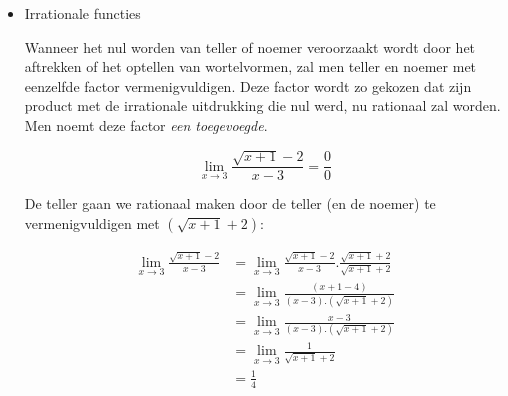 \begin{itemize}
\begin{voorbeeld}
Teller en noemer ontbinden in factoren:

teller: $x\text{\texttwosuperior}-9=(x-3)(x+3)$

noemer (via Horner): %
\begin{tabular}{cc|ccc}
	&  & $1$ & $1$ & $-12$\\
	& $3$ & $\downarrow$ & $3$ & $12$\\
	\cline{2-5} 
	&  & $1$ & \multicolumn{1}{c||}{$4$} & $0$\\
\end{tabular}

dus \begin{equation*}
x\text{\texttwosuperior}+x-12=(x-3)(x+4)
\end{equation*}

zodat \begin{equation}
{\displaystyle {\displaystyle \lim_{x\to3}}\frac{x\text{\texttwosuperior}-4}{x\text{\texttwosuperior}-7x+10}={\displaystyle \lim_{x\to3}}\frac{(x-3)(x+3)}{(x-3)(x+4)}={\displaystyle \lim_{x\to3}}\frac{(x+3)}{(x+4)}=\frac{3+3}{3+4}=\frac{6}{7}}
\end{equation}
\end{voorbeeld}


\item{Irrationale functies}

Wanneer het nul worden van teller of noemer veroorzaakt wordt door
het aftrekken of het optellen van wortelvormen, zal men teller en
noemer met eenzelfde factor vermenigvuldigen. Deze factor wordt zo
gekozen dat zijn product met de irrationale uitdrukking die nul werd,
nu rationaal zal worden. Men noemt deze factor \emph{een toegevoegde}.


\begin{voorbeeld}
	\begin{equation*}
{\displaystyle {\displaystyle \lim_{x\to3}}\frac{\sqrt{x+1}-2}{x-3}=\frac{0}{0}}
\end{equation*}

De teller gaan we rationaal maken door de teller (en de noemer) te
vermenigvuldigen met $\left(\sqrt{x+1}+2\right)$:

\begin{equation*}
\begin{array}{cl}
{\displaystyle {\displaystyle \lim_{x\to3}}\frac{\sqrt{x+1}-2}{x-3}} & {\displaystyle ={\displaystyle \lim_{x\to3}}\frac{\sqrt{x+1}-2}{x-3}.\frac{\sqrt{x+1}+2}{\sqrt{x+1}+2}}\\
& {\displaystyle ={\displaystyle \lim_{x\to3}}\frac{\left(x+1-4\right)}{\left(x-3\right).\left(\sqrt{x+1}+2\right)}}\\
& {\displaystyle ={\displaystyle \lim_{x\to3}}\frac{x-3}{\left(x-3\right).\left(\sqrt{x+1}+2\right)}}\\
& {\displaystyle ={\displaystyle \lim_{x\to3}}\frac{1}{\sqrt{x+1}+2}}\\
& =\frac{1}{4}
\end{array}
\end{equation*}
\end{voorbeeld}


\end{itemize}
